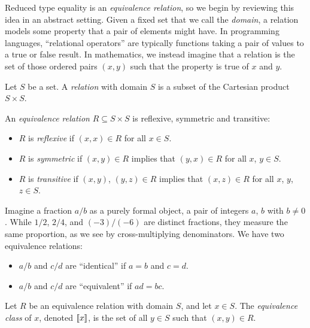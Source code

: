 \documentclass[../generics]{subfiles}
\begin{document}
Reduced type equality is an \emph{equivalence relation}, so we begin by reviewing this idea in an abstract setting. Given a fixed set that we call the \emph{domain}, a relation models some property that a pair of elements might have. In programming languages, ``relational operators'' are typically functions taking a pair of values to a true or false result. In mathematics, we instead imagine that a relation is the set of those ordered pairs $(x,y)$ such that the property is true of $x$ and $y$.

\begin{definition}\label{def relation}
Let $S$ be a set. A \emph{relation} with domain $S$ is a subset of the Cartesian product $S\times S$.
\end{definition}

\begin{definition}
An \emph{equivalence relation} $R\subseteq S\times S$ is reflexive, symmetric and transitive:
\begin{itemize}
\item $R$ is \emph{reflexive} if $(x,x)\in R$ for all $x\in S$.
\item $R$ is \emph{symmetric} if $(x,y)\in R$ implies that $(y,x)\in R$ for all $x$, $y\in S$.
\item $R$ is \emph{transitive} if $(x,y)$, $(y,z)\in R$ implies that $(x,z)\in R$ for all $x$, $y$, $z\in S$.
\end{itemize}
\end{definition}

Imagine a fraction $a/b$ as a purely formal object, a pair of integers $a$, $b$ with $b \neq 0$. While $1/2$, $2/4$, and $(-3)/(-6)$ are distinct fractions, they measure the same proportion, as we see by cross-multiplying denominators. We have two equivalence relations:
\begin{itemize}
\item $a/b$ and $c/d$ are ``identical'' if $a=b$ and $c=d$.
\item $a/b$ and $c/d$ are ``equivalent'' if $ad=bc$.
\end{itemize}

\begin{definition}
Let $R$ be an equivalence relation with domain $S$, and let $x\in S$. The \emph{equivalence class} of $x$, denoted $[\![x]\!]$, is the set of all $y\in S$ such that $(x, y)\in R$.
\end{definition}
\end{document}

